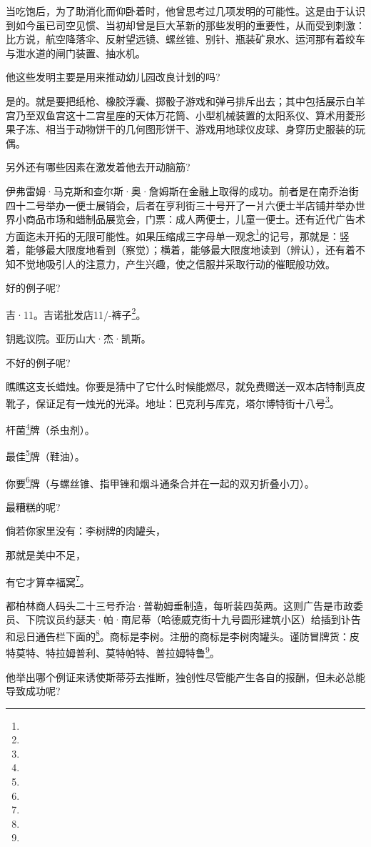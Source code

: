 \par 当吃饱后，为了助消化而仰卧着时，他曾思考过几项发明的可能性。这是由于认识到如今虽已司空见惯、当初却曾是巨大革新的那些发明的重要性，从而受到刺激：比方说，航空降落伞、反射望远镜、螺丝锥、别针、瓶装矿泉水、运河那有着绞车与泄水道的闸门装置、抽水机。
\par 他这些发明主要是用来推动幼儿园改良计划的吗?
\par 是的。就是要把纸枪、橡胶浮囊、掷骰子游戏和弹弓排斥出去；其中包括展示白羊宫乃至双鱼宫这十二宫星座的天体万花筒、小型机械装置的太阳系仪、算术用菱形果子冻、相当于动物饼干的几何图形饼干、游戏用地球仪皮球、身穿历史服装的玩偶。
\par 另外还有哪些因素在激发着他去开动脑筋?
\par 伊弗雷姆·马克斯和查尔斯·奥·詹姆斯在金融上取得的成功。前者是在南乔治街四十二号举办一便士展销会，后者在亨利街三十号开了一爿六便士半店铺并举办世界小商品市场和蜡制品展览会，门票：成人两便士，儿童一便士。还有近代广告术方面迄未开拓的无限可能性。如果压缩成三字母单一观念\footnote{}的记号，那就是：竖着，能够最大限度地看到（察觉）；横着，能够最大限度地读到（辨认），还有着不知不觉地吸引人的注意力，产生兴趣，使之信服并采取行动的催眠般功效。
\par 好的例子呢?
\par 吉·11。吉诺批发店11/-裤子\footnote{}。
\par 钥匙议院。亚历山大·杰·凯斯。
\par 不好的例子呢?
\par 瞧瞧这支长蜡烛。你要是猜中了它什么时候能燃尽，就免费赠送一双本店特制真皮靴子，保证足有一烛光的光泽。地址：巴克利与库克，塔尔博特街十八号\footnote{}。
\par 杆菌\footnote{}牌（杀虫剂）。
\par 最佳\footnote{}牌（鞋油）。
\par 你要\footnote{}牌（与螺丝锥、指甲锉和烟斗通条合并在一起的双刃折叠小刀）。
\par 最糟糕的呢?
\par 倘若你家里没有：李树牌的肉罐头，
\par 那就是美中不足，
\par 有它才算幸福窝\footnote{}。
\par 都柏林商人码头二十三号乔治·普勒姆垂制造，每听装四英两。这则广告是市政委员、下院议员约瑟夫·帕·南尼蒂（哈德威克街十九号圆形建筑小区）给插到讣告和忌日通告栏下面的\footnote{}。商标是李树。注册的商标是李树肉罐头。谨防冒牌货：皮特莫特、特拉姆普利、莫特帕特、普拉姆特鲁\footnote{}。
\par 他举出哪个例证来诱使斯蒂芬去推断，独创性尽管能产生各自的报酬，但未必总能导致成功呢?
